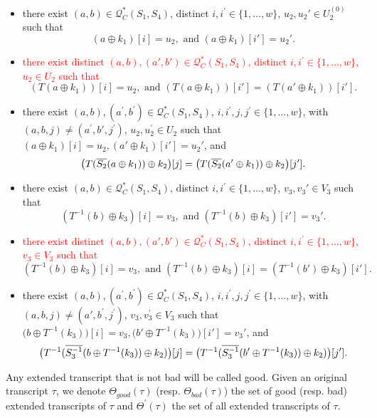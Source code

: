 \begin{definition}
\begin{itemize}[leftmargin=10mm]
	\item[\cfour]
	there exist $(a, b) \in \mathcal{Q}_{C}^{*}\left(S_{1}, S_{4}\right)$, distinct $i, i^{\prime}\in\{1, \ldots, w\}$, $u_{2},u_{2}' \in U_{2}^{(0)}$ such that
	$$(a \oplus k_1)[i] = u_2,\text{ and }
	(a \oplus k_1)[i'] = u_2'.$$
	\item[\cfive] \textcolor{red}{there exist distinct $(a, b),(a',b') \in \mathcal{Q}_{C}^{*}\left(S_{1}, S_{4}\right)$, distinct $i, i^{\prime}\in\{1, \ldots, w\}$, $u_{2} \in U_{2}$ such that}
	$$\left(T\left(a \oplus k_{1}\right)\right)[i] = u_2,\text{ and }
	\left(T\left(a \oplus k_{1}\right)\right)[i'] = \left(T\left(a' \oplus k_{1}\right)\right)[i'].$$
	\item[\csix]
	there exist $(a, b), (a^{\prime}, b^{\prime}) \in \mathcal{Q}_{C}^{*}\left(S_{1}, S_{4}\right)$, $i, i^{\prime},j, j^{\prime} \in\{1, \ldots, w\}$, with $(a,b, j) \neq \left(a^{\prime}, b',j^{\prime}\right)$, $u_{2}, u_{2}^{\prime} \in U_{2}$ such that $(a \oplus k_1)[i] = u_2, (a' \oplus k_1)[i'] = u_2'$, and
	$$\big(T(\overline{S_2}(a\oplus k_1))\oplus k_2\big)[j]=\big(T(\overline{S_2}(a'\oplus k_1))\oplus k_2\big)[j'].
	$$
	\item[\cseven]
	there exist $(a, b) \in \mathcal{Q}_{C}^{*}\left(S_{1}, S_{4}\right)$, distinct $i, i^{\prime}\in\{1, \ldots, w\}$, $v_{3},v_{3}' \in V_{3}$ such that
	$$\left(T^{-1}\left(b\right) \oplus k_{3}\right)[i] = v_3,\text{ and }
	\left(T^{-1}\left(b\right) \oplus k_{3}\right)[i'] = v_3'.$$
	\item[\ceight]
	\textcolor{red}{there exist distinct $(a, b),(a',b') \in \mathcal{Q}_{C}^{*}\left(S_{1}, S_{4}\right)$, distinct $i, i^{\prime}\in\{1, \ldots, w\}$, $v_{3} \in V_{3}$ such that}
	$$\left(T^{-1}\left(b\right) \oplus k_{3}\right)[i] = v_3,\text{ and }
	\left(T^{-1}\left(b\right) \oplus k_{3}\right)[i] =\left(T^{-1}\left(b'\right) \oplus k_{3}\right)[i'].$$
	\item[\cnine]
	there exist $(a, b), (a^{\prime}, b^{\prime}) \in \mathcal{Q}_{C}^{*}\left(S_{1}, S_{4}\right)$, $i, i^{\prime}, j, j^{\prime} \in\{1, \ldots, w\}$, with $(a,b, j) \neq \left(a',b^{\prime}, j^{\prime}\right)$, $v_{3},v_{3}^{\prime} \in V_{3}$ such that $\big(b \oplus T^{-1}(k_3)\big)[i] = v_3, \big(b' \oplus T^{-1}(k_3)\big)[i'] = v_3'$, and
	$$\big(T^{-1}(\overline{S_3^{-1}}(b \oplus T^{-1}(k_3))\oplus k_2)\big)[j]=\big(T^{-1}(\overline{S_3^{-1}}(b' \oplus T^{-1}(k_3))\oplus k_2)\big)[j'].
	$$
\end{itemize}
Any extended transcript that is not bad will be called good. Given an original transcript $\tau$, we denote $\Theta_{good}(\tau)$ (resp. $\Theta_{bad}(\tau)$) the set of good (resp. bad) extended transcripts of $\tau$ and $\Theta^{'}(\tau)$ the set of all extended transcripts of $\tau$.
\end{definition}





